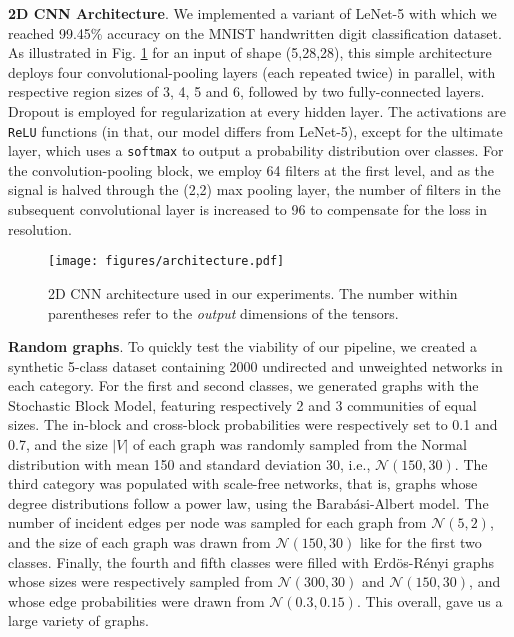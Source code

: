 \documentclass[runningheads]{llncs}
\begin{document}
\noindent \textbf{2D CNN Architecture}.
We implemented a variant of LeNet-5 \cite{lecun1998gradient} with which we reached 99.45\% accuracy on the MNIST handwritten digit classification dataset. As illustrated in Fig. \ref{fig:arch} for an input of shape (5,28,28), this simple architecture deploys four convolutional-pooling layers (each repeated twice) in parallel, with respective region sizes of 3, 4, 5 and 6, followed by two fully-connected layers. Dropout \cite{srivastava2014dropout} is employed for regularization at every hidden layer. The activations are \texttt{ReLU} functions (in that, our model differs from LeNet-5), except for the ultimate layer, which uses a \texttt{softmax} to output a probability distribution over classes. For the convolution-pooling block, we employ 64 filters at the first level, and as the signal is halved through the (2,2) max pooling layer, the number of filters in the subsequent convolutional layer is increased to 96 to compensate for the loss in resolution.

\vspace{-0.4cm}

\begin{figure}[h]
  \centering
    \texttt{[image: figures/architecture.pdf]}
\captionsetup{justification=justified,singlelinecheck=false, size=small}
    \caption{2D CNN architecture used in our experiments. The number within parentheses refer to the \textit{output} dimensions of the tensors. }
\label{fig:arch}
\end{figure}

\vspace{-0.6cm}

\noindent \textbf{Random graphs}.
To quickly test the viability of our pipeline, we created a synthetic 5-class dataset containing 2000 undirected and unweighted networks in each category. For the first and second classes, we generated graphs with the Stochastic Block Model, featuring respectively 2 and 3 communities of equal sizes. The in-block and cross-block probabilities were respectively set to 0.1 and 0.7, and the size $|V|$ of each graph was randomly sampled from the Normal distribution with mean 150 and standard deviation 30, i.e., $\mathcal{N}(150,30)$. The third category was populated with scale-free networks, that is, graphs whose degree distributions follow a power law, using the Barab{\'a}si-Albert model. The number of incident edges per node was sampled for each graph from $\mathcal{N}(5,2)$, and the size of each graph was drawn from $\mathcal{N}(150,30)$ like for the first two classes. Finally, the fourth and fifth classes were filled with Erd{\"o}s-R{\'e}nyi graphs whose sizes were respectively sampled from $\mathcal{N}(300,30)$ and $\mathcal{N}(150,30)$, and whose edge probabilities were drawn from $\mathcal{N}(0.3,0.15)$. This overall, gave us a large variety of graphs.
\end{document}
